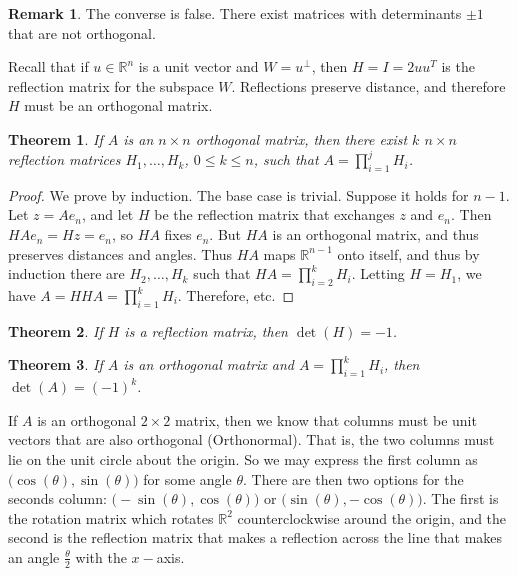 \documentclass[oneside]{book}
\newtheorem{theorem}{Theorem}[section]
\theoremstyle{definition}
\newtheorem{remark}{Remark}[section]
\begin{document}
\begin{remark}
The converse is false. There exist matrices with determinants $\pm 1$ that are not orthogonal.
\end{remark}

Recall that if $u\in \mathbb{R}^n$ is a unit vector and $W = u^{\perp}$, then $H = I=2uu^T$ is the reflection matrix for the subspace $W$. Reflections preserve distance, and therefore $H$ must be an orthogonal matrix. 

\begin{theorem} If $A$ is an $n\times n$ orthogonal matrix, then there exist $k$ $n\times n$ reflection matrices $H_1,\hdots, H_k$, $0\leq k \leq n$, such that $A = \prod_{i=1}^{j}H_i$.
\end{theorem}
\begin{proof}
We prove by induction. The base case is trivial. Suppose it holds for $n-1$. Let $z = Ae_n$, and let $H$ be the reflection matrix that exchanges $z$ and $e_n$. Then $HAe_n = Hz = e_n$, so $HA$ fixes $e_n$. But $HA$ is an orthogonal matrix, and thus preserves distances and angles. Thus $HA$ maps $\mathbb{R}^{n-1}$ onto itself, and thus by induction there are $H_2,\hdots, H_k$ such that $HA = \prod_{i=2}^{k} H_i$. Letting $H=H_1$, we have $A = HHA = \prod_{i=1}^{k}H_i$. Therefore, etc.
\end{proof}

\begin{theorem}
If $H$ is a reflection matrix, then $\det(H) = -1$.
\end{theorem}

\begin{theorem}
If $A$ is an orthogonal matrix and $A=\prod_{i=1}^{k} H_i$, then $\det(A) = (-1)^k$.
\end{theorem}

If $A$ is an orthogonal $2\times 2$ matrix, then we know that columns must be unit vectors that are also orthogonal (Orthonormal). That is, the two columns must lie on the unit circle about the origin. So we may express the first column as $\big(\cos(\theta),\sin(\theta)\big)$ for some angle $\theta$. There are then two options for the seconds column: $\big(-\sin(\theta),\cos(\theta)\big)$ or $\big(\sin(\theta),-\cos(\theta)\big)$. The first is the rotation matrix which rotates $\mathbb{R}^2$ counterclockwise around the origin, and the second is the reflection matrix that makes a reflection across the line that makes an angle $\frac{\theta}{2}$ with the $x-$axis. 
\end{document}

